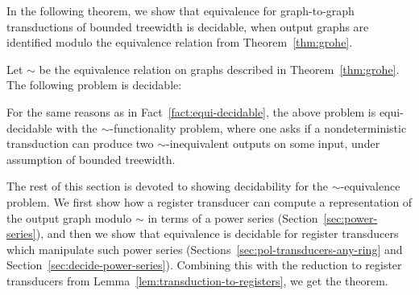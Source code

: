 In the following theorem, we show that equivalence for graph-to-graph \mso transductions of bounded treewidth is decidable, when output graphs are identified modulo the equivalence relation from Theorem~\ref{thm:grohe}. 
\begin{theorem}\label{thm:path-equivalence}
    Let $\sim$ be the equivalence relation on graphs described in Theorem~\ref{thm:grohe}. 
    The following problem is decidable:
\end{theorem}
 
For the same reasons as in Fact~\ref{fact:equi-decidable}, the above problem is equi-decidable with the $\sim$-functionality problem, where one asks if a nondeterministic transduction can produce two $\sim$-inequivalent outputs on some input, under assumption of bounded treewidth. 

The rest of this section is devoted to showing decidability for the  $\sim$-equivalence problem. We first show how a register transducer can compute a representation of the output graph modulo $\sim$ in terms of a power series (Section~\ref{sec:power-series}), and then we show that equivalence is decidable for register transducers which manipulate such power series (Sections~\ref{sec:pol-transducers-any-ring} and Section~\ref{sec:decide-power-series}). Combining this with the reduction to register transducers from Lemma~\ref{lem:transduction-to-registers}, we get the theorem.

